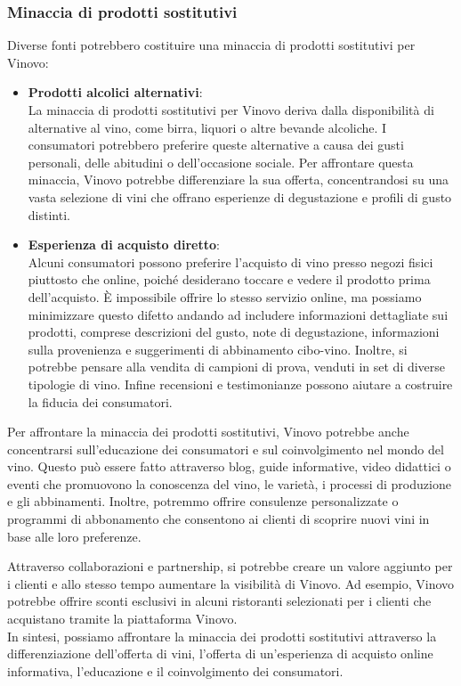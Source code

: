 \documentclass[12pt, a4paper]{article}
\newcommand{\meskip}{\medskip \\}
\begin{document}
\subsubsection{Minaccia di prodotti sostitutivi}
Diverse fonti potrebbero costituire una minaccia di prodotti sostitutivi per Vinovo:
\begin{itemize}
    \item \textbf{Prodotti alcolici alternativi}:\\
          La minaccia di prodotti sostitutivi per Vinovo deriva dalla disponibilità di alternative al vino, come birra, liquori o altre bevande alcoliche. I consumatori potrebbero preferire queste alternative a causa dei gusti personali, delle abitudini o dell'occasione sociale. Per affrontare questa minaccia, Vinovo potrebbe differenziare la sua offerta, concentrandosi su una vasta selezione di vini che offrano esperienze di degustazione e profili di gusto distinti.
    \item  \textbf{Esperienza di acquisto diretto}:\\
          Alcuni consumatori possono preferire l'acquisto di vino presso negozi fisici piuttosto che online, poiché desiderano toccare e vedere il prodotto prima dell'acquisto. È impossibile offrire lo stesso servizio online, ma possiamo minimizzare questo difetto andando ad includere informazioni dettagliate sui prodotti, comprese descrizioni del gusto, note di degustazione, informazioni sulla provenienza e suggerimenti di abbinamento cibo-vino. Inoltre, si potrebbe pensare alla vendita di campioni di prova, venduti in set di diverse tipologie di vino. Infine recensioni e testimonianze possono aiutare a costruire la fiducia dei consumatori.
\end{itemize}
Per affrontare la minaccia dei prodotti sostitutivi, Vinovo potrebbe anche concentrarsi sull'educazione dei consumatori e sul coinvolgimento nel mondo del vino. Questo può essere fatto attraverso blog, guide informative, video didattici o eventi che promuovono la conoscenza del vino, le varietà, i processi di produzione e gli abbinamenti. Inoltre, potremmo offrire consulenze personalizzate o programmi di abbonamento che consentono ai clienti di scoprire nuovi vini in base alle loro preferenze.

Attraverso collaborazioni e partnership, si potrebbe creare un valore aggiunto per i clienti e allo stesso tempo aumentare la visibilità di Vinovo. Ad esempio, Vinovo potrebbe offrire sconti esclusivi in alcuni ristoranti selezionati per i clienti che acquistano tramite la piattaforma Vinovo.\meskip
In sintesi, possiamo affrontare la minaccia dei prodotti sostitutivi attraverso la differenziazione dell'offerta di vini, l'offerta di un'esperienza di acquisto online informativa, l'educazione e il coinvolgimento dei consumatori.
\end{document}
